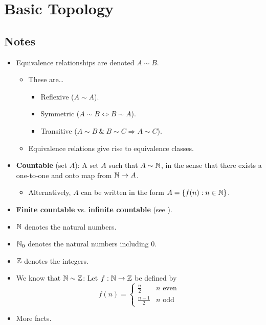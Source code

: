 \documentclass[../../notes.tex]{subfiles}
\begin{document}
\chapter{Basic Topology}
\section{Notes}
\begin{itemize}
    \item {}Equivalence relationships are denoted $A\sim B$.
    \begin{itemize}
        \item These are\dots
        \begin{itemize}
            \item Reflexive ($A\sim A$).
            \item Symmetric ($A\sim B\Longleftrightarrow B\sim A$).
            \item Transitive ($A\sim B\ \&\ B\sim C\Longrightarrow A\sim C$).
        \end{itemize}
        \item Equivalence relations give rise to equivalence classes.
    \end{itemize}
    \item \textbf{Countable} (set $A$): A set $A$ such that $A\sim\mathbb{N}$, in the sense that there exists a one-to-one and onto map from $\mathbb{N}\to A$.
    \begin{itemize}
        \item Alternatively, $A$ can be written in the form $A=\{f(n):n\in\mathbb{N}\}$.
    \end{itemize}
    \item \textbf{Finite countable} vs. \textbf{infinite countable} (see \textcite{bib:Rudin}).
    \item $\mathbb{N}$ denotes the natural numbers.
    \item $\mathbb{N}_0$ denotes the natural numbers including 0.
    \item $\mathbb{Z}$ denotes the integers.
    \item We know that $\mathbb{N}\sim\mathbb{Z}$: Let $f:\mathbb{N}\to\mathbb{Z}$ be defined by
    \begin{equation*}
        f(n) =
        \begin{cases}
            \frac{n}{2} & n\text{ even}\\
            \frac{n-1}{2} & n\text{ odd}
        \end{cases}
    \end{equation*}
    \item More facts.

\end{itemize}
\end{document}
